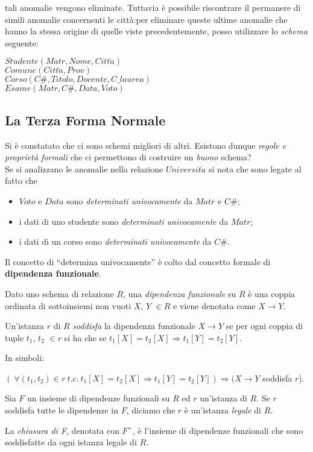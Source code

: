 tali anomalie vengono eliminate. Tuttavia è possibile riscontrare il permanere di simili 
anomalie concernenti le città:per eliminare queste ultime anomalie che hanno la stessa 
origine di quelle viste precedentemente, posso utilizzare lo \emph{schema} seguente:
\begin{center}
  $Studente(Matr,Nome,Citt\grave{a})$\\
  $Comune(Citt\grave{a},Prov)$\\
  $Corso(C\#,Titolo,Docente, C\_laurea)$\\
  $Esame(Matr, C\#, Data,Voto)$
\end{center}

\subsection{La Terza Forma Normale}
Si è constatato che ci sono schemi migliori di altri. Esistono dunque \emph{regole 
e proprietà formali} che ci permettono di costruire un \emph{buono} schema?\\
Se si analizzano le anomalie nella relazione $Universit\grave{a}$ si nota che sono 
legate al fatto che
\begin{itemize}
 \item $Voto$ e $Data$ sono \emph{determinati univocamente} da $Matr$ e $C\#$;
 \item  i dati di uno studente sono \emph{determinati univocamente} da $Matr$;
 \item i dati di un corso sono \emph{determinati univocamente} da $C\#$.
\end{itemize}
Il concetto di ``determina univocamente'' è colto dal concetto formale di \textbf{dipendenza funzionale}.
\begin{defn}
  Dato uno schema di relazione $R$, una \emph{dipendenza funzionale} su $R$ 
  è una coppia ordinata di sottoinsiemi non vuoti $X$, $Y$ $\in R$ e viene denotata 
  come $X \rightarrow Y$.
\end{defn}
\begin{prop}
Un'istanza $r$ di $R$ \emph{soddisfa} la dipendenza funzionale $X \rightarrow Y$
se per ogni coppia di tuple $t_1$, $t_2$ $\in r$ si ha che se $t_1[X] = t_2[X] 
\Rightarrow t_1[Y] = t_2[Y]$. 
\end{prop}
In simboli:
\begin{center}
\begin{math}
(\ \forall (t_1, t_2) \in r\ t.c.\ t_1[X] = t_2[X] \Rightarrow t_1[Y] = t_2[Y]) 
\Rightarrow (X\rightarrow Y
\end{math}
soddisfa $r$).
\end{center}
Sia $F$ un insieme di dipendenze funzionali su $R$ ed $r$ un'istanza di $R$. Se $r$ 
soddisfa tutte le dipendenze in $F$, diciamo che $r$ è un'istanza \emph{legale} di $R$. 
\begin{defn}
La \emph{chiusura di F}, denotata con $F^+$, è l'insieme di dipendenze funzionali che 
sono soddisfatte da ogni istanza legale di $R$. 
\end{defn}

